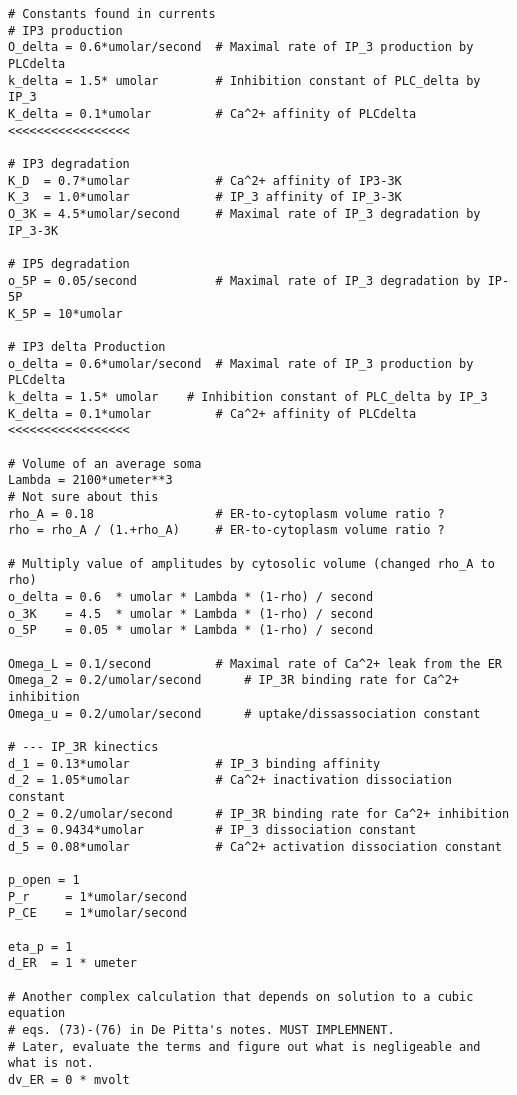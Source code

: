 \documentclass{article}
\begin{document}
\begin{verbatim}
# Constants found in currents
# IP3 production
O_delta = 0.6*umolar/second  # Maximal rate of IP_3 production by PLCdelta
k_delta = 1.5* umolar        # Inhibition constant of PLC_delta by IP_3
K_delta = 0.1*umolar         # Ca^2+ affinity of PLCdelta   <<<<<<<<<<<<<<<<<

# IP3 degradation
K_D  = 0.7*umolar            # Ca^2+ affinity of IP3-3K
K_3  = 1.0*umolar            # IP_3 affinity of IP_3-3K
O_3K = 4.5*umolar/second     # Maximal rate of IP_3 degradation by IP_3-3K

# IP5 degradation
o_5P = 0.05/second           # Maximal rate of IP_3 degradation by IP-5P
K_5P = 10*umolar

# IP3 delta Production
o_delta = 0.6*umolar/second  # Maximal rate of IP_3 production by PLCdelta
k_delta = 1.5* umolar    # Inhibition constant of PLC_delta by IP_3
K_delta = 0.1*umolar         # Ca^2+ affinity of PLCdelta   <<<<<<<<<<<<<<<<<

# Volume of an average soma
Lambda = 2100*umeter**3
# Not sure about this
rho_A = 0.18                 # ER-to-cytoplasm volume ratio ?
rho = rho_A / (1.+rho_A)     # ER-to-cytoplasm volume ratio ?

# Multiply value of amplitudes by cytosolic volume (changed rho_A to rho)
o_delta = 0.6  * umolar * Lambda * (1-rho) / second
o_3K    = 4.5  * umolar * Lambda * (1-rho) / second
o_5P    = 0.05 * umolar * Lambda * (1-rho) / second

Omega_L = 0.1/second         # Maximal rate of Ca^2+ leak from the ER
Omega_2 = 0.2/umolar/second      # IP_3R binding rate for Ca^2+ inhibition
Omega_u = 0.2/umolar/second      # uptake/dissassociation constant

# --- IP_3R kinectics
d_1 = 0.13*umolar            # IP_3 binding affinity
d_2 = 1.05*umolar            # Ca^2+ inactivation dissociation constant
O_2 = 0.2/umolar/second      # IP_3R binding rate for Ca^2+ inhibition
d_3 = 0.9434*umolar          # IP_3 dissociation constant
d_5 = 0.08*umolar            # Ca^2+ activation dissociation constant

p_open = 1
P_r     = 1*umolar/second
P_CE    = 1*umolar/second

eta_p = 1
d_ER  = 1 * umeter

# Another complex calculation that depends on solution to a cubic equation
# eqs. (73)-(76) in De Pitta's notes. MUST IMPLEMNENT. 
# Later, evaluate the terms and figure out what is negligeable and what is not. 
dv_ER = 0 * mvolt


\end{verbatim}
\end{document}
